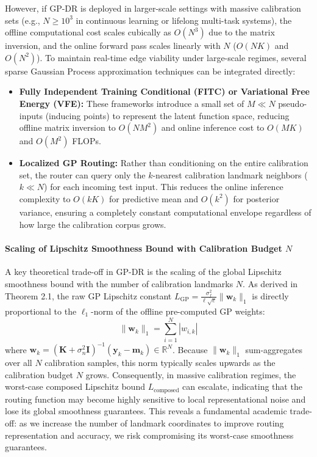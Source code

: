 \documentclass{article}
\theoremstyle{plain}
\theoremstyle{definition}
\theoremstyle{remark}
\begin{document}
However, if GP-DR is deployed in larger-scale settings with massive calibration sets (e.g., $N \ge 10^3$ in continuous learning or lifelong multi-task systems), the offline computational cost scales cubically as $O(N^3)$ due to the matrix inversion, and the online forward pass scales linearly with $N$ ($O(NK)$ and $O(N^2)$). To maintain real-time edge viability under large-scale regimes, several sparse Gaussian Process approximation techniques can be integrated directly:
\begin{itemize}
    \item \textbf{Fully Independent Training Conditional (FITC) or Variational Free Energy (VFE):} These frameworks introduce a small set of $M \ll N$ pseudo-inputs (inducing points) to represent the latent function space, reducing offline matrix inversion to $O(N M^2)$ and online inference cost to $O(MK)$ and $O(M^2)$ FLOPs.
    \item \textbf{Localized GP Routing:} Rather than conditioning on the entire calibration set, the router can query only the $k$-nearest calibration landmark neighbors ($k \ll N$) for each incoming test input. This reduces the online inference complexity to $O(k K)$ for predictive mean and $O(k^2)$ for posterior variance, ensuring a completely constant computational envelope regardless of how large the calibration corpus grows.
\end{itemize}

\paragraph{Scaling of Lipschitz Smoothness Bound with Calibration Budget $N$}
A key theoretical trade-off in GP-DR is the scaling of the global Lipschitz smoothness bound with the number of calibration landmarks $N$. As derived in Theorem 2.1, the raw GP Lipschitz constant $L_{\text{GP}} = \frac{\sigma_f^2}{\ell \sqrt{e}} \|\mathbf{w}_k\|_1$ is directly proportional to the $\ell_1$-norm of the offline pre-computed GP weights:
\begin{equation}
\|\mathbf{w}_k\|_1 = \sum_{i=1}^N |w_{i, k}|
\label{eq:weight_norm_l1}
\end{equation}
where $\mathbf{w}_k = \left( \mathbf{K} + \sigma_n^2 \mathbf{I} \right)^{-1} \left( \mathbf{y}_k - \mathbf{m}_k \right) \in \mathbb{R}^N$.
Because $\|\mathbf{w}_k\|_1$ sum-aggregates over all $N$ calibration samples, this norm typically scales upwards as the calibration budget $N$ grows. Consequently, in massive calibration regimes, the worst-case composed Lipschitz bound $L_{\text{composed}}$ can escalate, indicating that the routing function may become highly sensitive to local representational noise and lose its global smoothness guarantees. This reveals a fundamental academic trade-off: as we increase the number of landmark coordinates to improve routing representation and accuracy, we risk compromising its worst-case smoothness guarantees.
\end{document}
